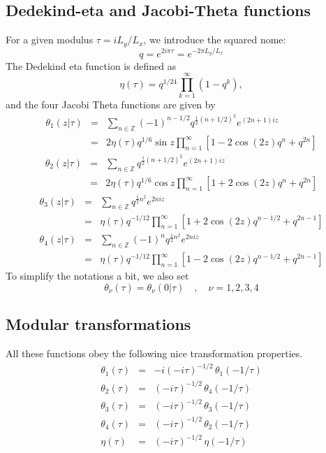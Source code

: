 \documentclass[11pt]{iopart}
\begin{document}
\subsection{Dedekind-eta and Jacobi-Theta functions}
For a given modulus $\tau=i L_y/L_x$, we introduce the squared nome:
\begin{equation}
 q=e^{2i\pi \tau}=e^{-2\pi L_y/L_x}
\end{equation}
The Dedekind eta function is defined as 
\begin{equation}
 \eta(\tau)=q^{1/ 24}\prod_{k=1}^{\infty}\left(1-q^k\right),
\end{equation}
and the four Jacobi Theta functions are given by
\begin{eqnarray}
 \theta_1(z|\tau)&=&\sum_{n \in \mathbb{Z}}(-1)^{n-1/2}q^{\frac{1}{2}(n+1/2)^2}e^{(2n+1)iz}\\
 &=&2\eta(\tau)q^{1/6} \sin z\prod_{n=1}^{\infty} \left[1-2 \cos(2z) q^{n}+q^{2n}\right]
\end{eqnarray}
\begin{eqnarray}
 \theta_2(z|\tau)&=&\sum_{n \in \mathbb{Z}}q^{\frac{1}{2}(n+1/2)^2}e^{(2n+1)iz}\\
 &=&2\eta(\tau)q^{1/6} \cos z\prod_{n=1}^{\infty} \left[1+2 \cos(2z) q^{n}+q^{2n}\right]
\end{eqnarray}
\begin{eqnarray}
 \theta_3(z|\tau)&=&\sum_{n \in \mathbb{Z}}q^{\frac{1}{2}n^2}e^{2niz}\\
 &=&\eta(\tau)q^{-1/12}\prod_{n=1}^{\infty} \left[1+2 \cos(2z) q^{n-1/2}+q^{2n-1}\right]
\end{eqnarray}
\begin{eqnarray}
 \theta_4(z|\tau)&=&\sum_{n \in \mathbb{Z}}(-1)^{n}q^{\frac{1}{2}n^2}e^{2niz}\\
 &=&\eta(\tau)q^{-1/12}\prod_{n=1}^{\infty} \left[1-2 \cos(2z) q^{n-1/2}+q^{2n-1}\right]
\end{eqnarray}
To simplify the notations a bit, we also set
\begin{equation}
 \theta_\nu(\tau)=\theta_\nu (0|\tau)\quad,\quad \nu=1,2,3,4
\end{equation}
\subsection{Modular transformations}
\label{sec:modular}
All these functions obey the following nice transformation properties. 
\begin{eqnarray}
 \theta_1(\tau)&=&-i (-i \tau )^{-1/2}\,\theta_1(-1/\tau)\\
 \theta_2(\tau)&=&(-i \tau )^{-1/2}\,\theta_4(-1/\tau)\\
 \theta_3(\tau)&=&(-i \tau )^{-1/2}\,\theta_3(-1/\tau)\\
 \theta_4(\tau)&=&(-i \tau )^{-1/2}\,\theta_2(-1/\tau)\\
 \eta(\tau)&=&(-i \tau )^{-1/2}\,\eta(-1/\tau)
\end{eqnarray}
\end{document}
